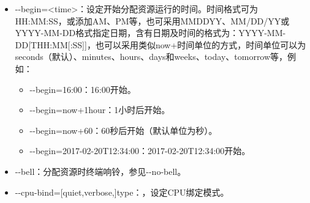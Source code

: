 \begin{itemize}
    \item -{}-begin=<time>：设定开始分配资源运行的时间。时间格式可为HH:MM:SS，或添加AM、PM等，也可采用MMDDYY、MM/DD/YY或YYYY-MM-DD格式指定日期，含有日期及时间的格式为：YYYY-MM-DD[THH:MM[:SS]]，也可以采用类似now+时间单位的方式，时间单位可以为seconds（默认）、minutes、hours、days和weeks、today、tomorrow等，例如：
	\begin{itemize}
		\item -{}-begin=16:00：16:00开始。
		\item -{}-begin=now+1hour：1小时后开始。
		\item -{}-begin=now+60：60秒后开始（默认单位为秒）。
		\item -{}-begin=2017-02-20T12:34:00：2017-02-20T12:34:00开始。
	\end{itemize}
    \item -{}-bell：分配资源时终端响铃，参见-{}-no-bell。
	\item -{}-cpu-bind=[{quiet,verbose},]type：，设定CPU绑定模式。


\end{itemize}
